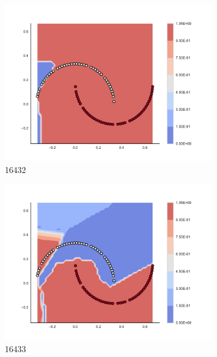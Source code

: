 \begin{figure}[h]
\begin{subfigure}[b]{0.09\textwidth}
    \includegraphics[clip, trim=2.35cm 1.75cm 4.5cm 0cm,width=\textwidth]{img/convergence/16432.pdf}
    \caption{16432}
    \label{fig:convergence_16432}
\end{subfigure}
%
\begin{subfigure}[b]{0.09\textwidth}
    \includegraphics[clip, trim=2.35cm 1.75cm 4.5cm 0cm,width=\textwidth]{img/convergence/16433.pdf}
    \caption{16433}
    \label{fig:convergence_16433}
\end{subfigure}
%
\begin{subfigure}[b]{0.09\textwidth}

\end{subfigure}
\end{figure}
